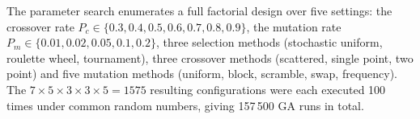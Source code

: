 The parameter search enumerates a full factorial design over five settings:
the crossover rate $P_c\in\{0.3, 0.4, 0.5, 0.6, 0.7, 0.8, 0.9\}$, the mutation rate $P_m\in\{0.01, 0.02, 0.05, 0.1, 0.2\}$, three
selection methods (stochastic uniform, roulette wheel, tournament), three
crossover methods (scattered, single point, two point) and five mutation
methods (uniform, block, scramble, swap, frequency). The
$7\times5\times3\times3\times5=1575$ resulting configurations were each
executed 100 times under common random numbers, giving 157\,500 GA runs in total.

